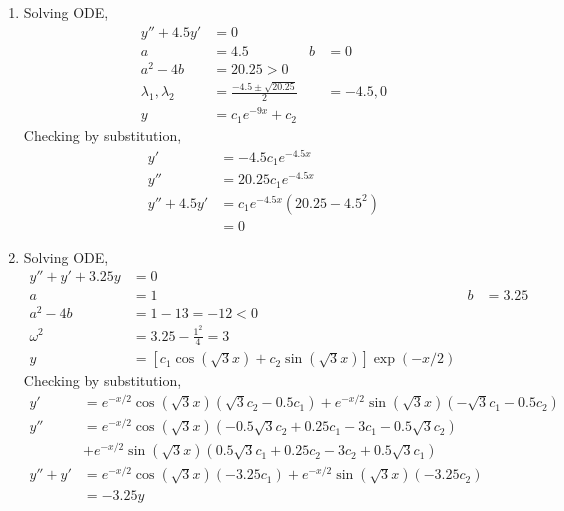 \begin{enumerate}
    \item Solving ODE,
          \begin{align}
              y'' + 4.5y'              & = 0                                 \\
              a                        & = 4.5                             &
              b                        & = 0                                 \\
              a^{2} - 4b               & = 20.25 > 0                         \\
              \lambda_{1}, \lambda_{2} & = \frac{-4.5 \pm \sqrt{20.25}}{2} &
                                       & = -4.5, 0                           \\
              y                        & = c_{1}e^{-9x} + c_{2}
          \end{align}
          Checking by substitution,
          \begin{align}
              y'          & = -4.5c_{1}e^{-4.5x}              \\
              y''         & = 20.25c_{1}e^{-4.5x}             \\
              y'' + 4.5y' & = c_{1}e^{-4.5x}(20.25 - 4.5^{2}) \\
                          & = 0
          \end{align}

    \item Solving ODE,
          \begin{align}
              y'' + y' + 3.25y & = 0                                       \\
              a                & = 1                          & b & = 3.25 \\
              a^{2} - 4b       & = 1 - 13 = -12 < 0                        \\
              \omega^{2}       & = 3.25 - \frac{1^{2}}{4} = 3              \\
              y                & = [c_{1}\cos(\sqrt{3} x)
              + c_{2}\sin(\sqrt{3} x)] \exp(-x/2)
          \end{align}
          Checking by substitution,
          \begin{align}
              y'       & = e^{-x/2}\cos(\sqrt{3} x) (\sqrt{3} c_{2} - 0.5c_{1})
              + e^{-x/2}\sin(\sqrt{3} x)(-\sqrt{3} c_{1} - 0.5c_{2})               \\
              y''      & = e^{-x/2}\cos(\sqrt{3} x)(-0.5\sqrt{3} c_{2} + 0.25c_{1}
              - 3c_{1} - 0.5\sqrt{3} c_{2})                                        \\
                       & + e^{-x/2}\sin(\sqrt{3} x)(0.5\sqrt{3} c_{1} + 0.25c_{2}
              - 3c_{2} + 0.5\sqrt{3} c_{1})                                        \\
              y'' + y' & = e^{-x/2}\cos(\sqrt{3} x)(-3.25c_{1}) + e^{-x/2}
              \sin(\sqrt{3}x)(-3.25c_{2})                                          \\
                       & = -3.25y
          \end{align}


\end{enumerate}
